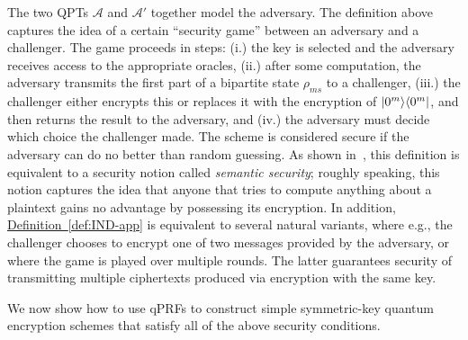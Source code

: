 \documentclass[envcountsame]{llncs}
\numberwithin{equation}{section}
\newcommand{\expref}[2]{\texorpdfstring{\hyperref[#2]{#1~\ref{#2}}}{#1~\ref{#2}}}
\newcommand{\algo}{\mathcal}
\begin{document}
The two QPTs $\algo A$ and $\algo A'$ together model the adversary. The definition above captures the idea of a certain ``security game'' between an adversary and a challenger. The game proceeds in steps: (i.) the key is selected and the adversary receives access to the appropriate oracles, (ii.) after some computation, the adversary transmits the first part of a bipartite state $\rho_{ms}$ to a challenger, (iii.) the challenger either encrypts this or replaces it with the encryption of ${\left\vert{0^m}\right\rangle}{\left\langle{0^m}\right\vert}$, and then returns the result to the adversary, and (iv.) the adversary must decide which choice the challenger made. The scheme is considered secure if the adversary can do no better than random guessing. As shown in~\cite{ABFGSS16}, this definition is equivalent to a security notion called \emph{semantic security}; roughly speaking, this notion captures the idea that anyone that tries to compute anything about a plaintext gains no advantage by possessing its encryption. In addition, \expref{Definition}{def:IND-app} is equivalent to several natural variants, where e.g., the challenger chooses to encrypt one of two messages provided by the adversary, or where the game is played over multiple rounds. The latter guarantees security of transmitting multiple ciphertexts produced via encryption with the same key.

We now show how to use qPRFs to construct simple symmetric-key quantum encryption schemes that satisfy all of the above security conditions.
\end{document}

